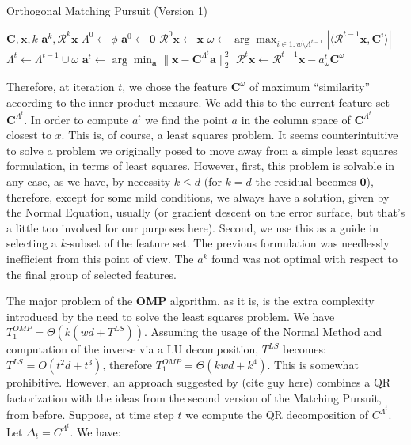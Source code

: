 \documentclass[12pt,a4paper,oneside,english]{UPBThesis}
\newcommand{\hcrange}[2]{\overline{{#1}\colon\!\!{#2}}}
\begin{document}
\begin{algorithm}
\caption{Orthogonal Matching Pursuit (Version 1)}
\label{algo:OrthogonalMatchingPursuitMethodV1}
\begin{algorithmic}
\Require $\textbf{C},\textbf{x},k$
\Ensure $\textbf{a}^k,\mathcal{R}^k\textbf{x}$
\State $\Lambda^0 \gets \phi$
\State $\textbf{a}^0 \gets \textbf{0}$
\State $\mathcal{R}^0\textbf{x} \gets \textbf{x}$
\For {$t = \hcrange{1}{k}$}
\State $\omega \gets \arg \max_{i \in \hcrange{1}{w} \setminus \Lambda^{t-1}} \left| \langle \mathcal{R}^{t-1}\textbf{x} , \textbf{C}^i \rangle \right|$
\State $\Lambda^t \gets \Lambda^{t-1} \cup \omega$
\State $\textbf{a}^t \gets \arg\min_{\textbf{a}} {\| \textbf{x} - \textbf{C}^{\Lambda^t}\textbf{a} \|_2^2}$
\State $\mathcal{R}^t\textbf{x} \gets \mathcal{R}^{t-1}\textbf{x} - a_\omega^t\textbf{C}^\omega$
\EndFor
\end{algorithmic}
\end{algorithm}

Therefore, at iteration $t$, we chose the feature $\textbf{C}^\omega$ of maximum ``similarity'' according to the inner product measure. We add this to the current feature set $\textbf{C}^{\Lambda^t}$. In order to compute $a^t$ we find the point $a$ in the column space of $\textbf{C}^{\Lambda^t}$ closest to $x$. This is, of course, a least squares problem. It seems counterintuitive to solve a problem we originally posed to move away from a simple least squares formulation, in terms of least squares. However, first, this problem is solvable in any case, as we have, by necessity $k \leq d$ (for $k = d$ the residual becomes $\textbf{0}$), therefore, except for some mild conditions, we always have a solution, given by the Normal Equation, usually (or gradient descent on the error surface, but that's a little too involved for our purposes here). Second, we use this as a guide in selecting a $k$-subset of the feature set. The previous formulation was needlessly inefficient from this point of view. The $a^k$ found was not optimal with respect to the final group of selected features.

The major problem of the \textbf{OMP} algorithm, as it is, is the extra complexity introduced by the need to solve the least squares problem. We have $T_1^{OMP} = \Theta(k(wd + T^{LS}))$. Assuming the usage of the Normal Method and computation of the inverse via a LU decomposition, $T^{LS}$ becomes: $T^{LS} = O(t^2d + t^3)$, therefore $T_1^{OMP} = \Theta(kwd + k^4)$. This is somewhat prohibitive. However, an approach suggested by (cite guy here) combines a QR factorization with the ideas from the second version of the Matching Pursuit, from before. Suppose, at time step $t$ we compute the QR decomposition of $C^{\Lambda^t}$. Let $\Delta_t = C^{\Lambda^t}$. We have:
\end{document}
